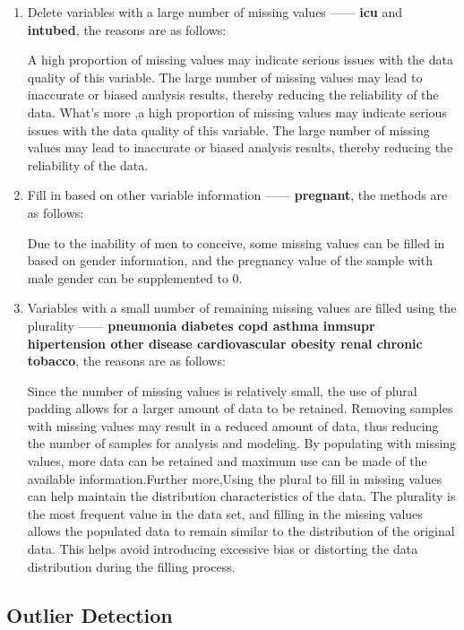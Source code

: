 \documentclass[
  journal=medium,
  manuscript=Report,
  year=2023,
  volume=37,
]{cup-journal}
\begin{document}
\begin{enumerate}
    \item Delete variables with a large number of missing values —— \textbf{icu} and \textbf{intubed}, the reasons are as follows:
    
    A high proportion of missing values may indicate serious issues with the data quality of this variable. The large number of missing values may lead to inaccurate or biased analysis results, thereby reducing the reliability of the data. What's more ,a high proportion of missing values may indicate serious issues with the data quality of this variable. The large number of missing values may lead to inaccurate or biased analysis results, thereby reducing the reliability of the data.
    
    \item Fill in based on other variable information —— \textbf{pregnant}, the methods are as follows:
    
    Due to the inability of men to conceive, some missing values can be filled in based on gender information, and the pregnancy value of the sample with male gender can be supplemented to 0.

    \item Variables with a small number of remaining missing values are filled using the plurality —— \textbf{pneumonia diabetes copd asthma inmsupr hipertension other disease cardiovascular obesity renal chronic tobacco}, the reasons are as follows:

    Since the number of missing values is relatively small, the use of plural padding allows for a larger amount of data to be retained. Removing samples with missing values may result in a reduced amount of data, thus reducing the number of samples for analysis and modeling. By populating with missing values, more data can be retained and maximum use can be made of the available information.Further more,Using the plural to fill in missing values can help maintain the distribution characteristics of the data. The plurality is the most frequent value in the data set, and filling in the missing values allows the populated data to remain similar to the distribution of the original data. This helps avoid introducing excessive bias or distorting the data distribution during the filling process.

\end{enumerate}

\subsection{Outlier Detection}
\end{document}
